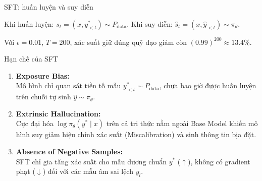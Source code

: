 \begin{frame}{SFT: huấn luyện và suy diễn}
\begin{center}
{%
    }
  \end{center}
  \vspace{0.5cm}
  Khi huấn luyện: $s_t = (x, y_{<t}^*) \sim P_{\text{data}}$. 
  Khi suy diễn: $\hat{s}_t = (x, \hat{y}_{<t}) \sim \pi_\theta$. 

  Với $\epsilon = 0.01$, $T = 200$, xác suất giữ đúng quỹ đạo giảm còn $(0.99)^{200} \approx 13.4\%$.
  \par\vspace{0pt}
\end{frame}

\begin{frame}{Hạn chế của SFT}
  \begin{enumerate}\setlength{\itemsep}{2pt}
    \item \textbf{Exposure Bias:}\\
      \small Mô hình chỉ quan sát tiền tố mẫu $y_{<t}^* \sim P_{\text{data}}$, chưa bao giờ được huấn luyện trên chuỗi tự sinh $\hat{y} \sim \pi_\theta$.
    \item \textbf{Extrinsic Hallucination:}\\
      \small Cực đại hóa $\log \pi_\theta(y^* \mid x)$ trên cả tri thức nằm ngoài Base Model khiến mô hình suy giảm hiệu chỉnh xác suất (Miscalibration) và sinh thông tin bịa đặt.
    \item \textbf{Absence of Negative Samples:}\\
      \small SFT chỉ gia tăng xác suất cho mẫu dương chuẩn $y^*$ ($\uparrow$), không có gradient phạt ($\downarrow$) đối với các mẫu âm sai lệch $y_l$.
  \end{enumerate}
\end{frame}
